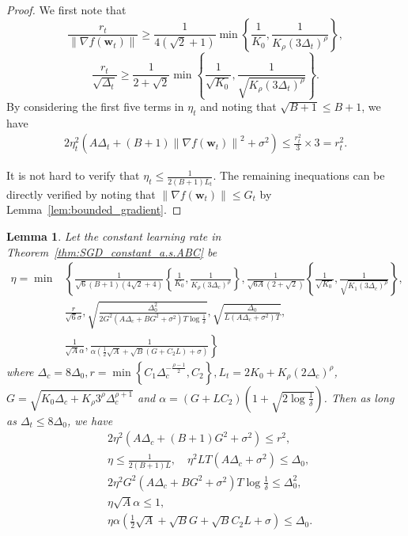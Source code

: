\documentclass{article}
\newtheorem{lemma}{Lemma}
\newcommand{\Norm}[1]{\left\|#1\right\|}
\newcommand{\Kr}{K_{\rho}}
\newcommand{\paren}[1]{\left( #1 \right)}
\newcommand{\bw}{\mathbf{w}}
\begin{document}
\begin{proof}
    We first note that
    $$\frac{r_t}{\Norm{\nabla f(\bw_t)}}\geq \frac{1}{4\paren{\sqrt{2}+1}}\min\left\{\frac{1}{K_0},\frac{1}{\Kr\paren{3\Delta_t}^\rho}\right\},$$
    $$\frac{r_t}{\sqrt{\Delta_t}}\geq\frac{1}{2+\sqrt{2}}\min\left\{\frac{1}{\sqrt{K_0}},\frac{1}{\sqrt{\Kr\paren{3\Delta_t}^\rho}}\right\}.$$
    By considering the first five terms in $\eta_t$ and noting that $\sqrt{B+1}\leq B+1$, we have
    \begin{align*}
        2\eta_t^2\paren{A\Delta_t+(B+1)\Norm{\nabla f(\bw_t)}^2+\sigma^2}\leq \frac{r_t^2}{3}\times 3=r_t^2.
    \end{align*}
    
    
    It is not hard to verify that $\eta_t\leq\frac{1}{2(B+1)L_t}$. The remaining inequations can be directly verified by noting that $\Norm{\nabla f(\bw_t)}\leq G_t$ by Lemma~\ref{lem:bounded_gradient}.
\end{proof}


\begin{lemma}\label{lem:sgd_stepsize_constant_ABC}
    Let the constant learning rate in Theorem~\ref{thm:SGD_constant_a.s.ABC} be 
    \begin{align*}
        \eta=\min&\left\{
        \frac{1}{\sqrt{6}(B+1)(4\sqrt{2}+4)}\left\{\frac{1}{K_0}, \frac{1}{\Kr\paren{3\Delta_c}^\rho}\right\},
        \frac{1}{\sqrt{6A}(2+\sqrt{2})}\left\{\frac{1}{\sqrt{K_0}}, \frac{1}{\sqrt{K_1 \paren{3\Delta_c}^\rho}}\right\},\right.\\
        &\left.\frac{r}{\sqrt{6}\sigma},\sqrt{\frac{\Delta_0^2}{2G^2\paren{A\Delta_c+BG^2+\sigma^2}T\log\frac{1}{\delta}}},
        \sqrt{\frac{\Delta_0}{L\paren{A\Delta_c+\sigma^2}T}}
        \right.,\\
        &\left.
        \frac{1}{\sqrt{A}\alpha}, \frac{1}{\alpha\paren{\frac{1}{2}\sqrt{A}+\sqrt{B}\paren{G+C_2L}+\sigma}}
        \right\}
    \end{align*}
    where $\Delta_c=8\Delta_0, r=\min\left\{C_1\Delta_c^{-\frac{\rho-1}{2}}, C_2\right\},L_t=2K_0+\Kr\paren{2\Delta_c}^\rho$, $G=\sqrt{K_0\Delta_c+\Kr 3^\rho\Delta_c^{\rho+1}}$ and $\alpha=\paren{G+LC_2}\paren{1+\sqrt{2\log\frac{1}{\delta}}}$. Then as long as $\Delta_t\leq 8\Delta_0$, we have
    \begin{align*}
        &2\eta^2\paren{A\Delta_c+(B+1)G^2+\sigma^2}\leq r^2,\\
        &\eta\leq\frac{1}{2(B+1)L},\quad\eta^2LT\paren{A\Delta_c+\sigma^2}\leq\Delta_0,\\
        &2\eta^2G^2\paren{A\Delta_c+BG^2+\sigma^2}T\log\frac{1}{\delta}\leq\Delta_0^2,\\
        &\eta\sqrt{A}\alpha\leq 1,\\
        &\eta\alpha\paren{\frac{1}{2}\sqrt{A}+\sqrt{B}G+\sqrt{B}C_2L+\sigma}\leq \Delta_0.
    \end{align*}
\end{lemma}
\end{document}
